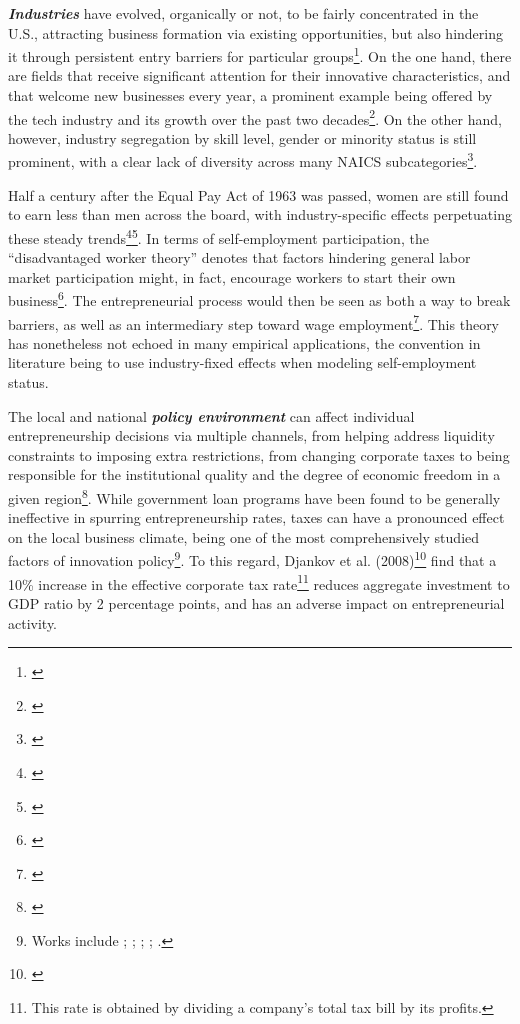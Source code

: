 \textit{\textbf{Industries}} have evolved, organically or not, to be fairly concentrated in the U.S., attracting business formation via existing opportunities, but also hindering it through persistent entry barriers for particular groups\footnote{\cite{ChatterjiGlaeserKerr2014}}. On the one hand, there are fields that receive significant attention for their innovative characteristics, and that welcome new businesses every year, a prominent example being offered by the tech industry and its growth over the past two decades\footnote{\cite{Berman2014}}. On the other hand, however,  industry segregation by skill level, gender or minority status is still prominent, with a clear lack of diversity across many NAICS subcategories\footnote{\cite{cartwright2011job}}. 

Half a century after the Equal Pay Act of 1963 was passed, women are still found to earn less than men across the board, with industry-specific effects perpetuating these steady trends\footnote{\cite{corbett2012graduating}}\hspace{.15em}\footnote{\cite{cartwright2011job}}. In terms of self-employment participation, the ``disadvantaged worker theory'' denotes that factors hindering general labor market participation might, in fact, encourage workers to start their own business\footnote{\cite{PatrickStephensWeinstein2016}}. The entrepreneurial process would then be seen as both a way to break barriers, as well as an intermediary step toward wage employment\footnote{\cite{PatrickStephensWeinstein2016}}. This theory has nonetheless not echoed in many empirical applications, the convention in literature being to use industry-fixed effects when modeling self-employment status.

The local and national \textbf{\textit{policy environment}} can affect individual entrepreneurship decisions via multiple channels, from helping address liquidity constraints to imposing extra restrictions, from changing corporate taxes to being responsible for the institutional quality and the degree of economic freedom in a given region\footnote{\cite{Williams2013}}. While government loan programs have been found to be generally ineffective in spurring entrepreneurship rates, taxes can have a pronounced effect on the local business climate, being one of the most comprehensively studied factors of innovation policy\footnote{Works include \cite{CullenGordon2006}; \cite{DjankovGanserMcLieshRamalhoShleifer2008}; \cite{Goetz2008}; \cite{Lerner2009}; \cite{Williams2013}.}. To this regard, Djankov et al. (2008)\footnote{\cite{DjankovGanserMcLieshRamalhoShleifer2008}} find that a 10\% increase in the effective corporate tax rate\footnote{ This rate is obtained by dividing a company’s total tax bill by its profits.} reduces aggregate investment to GDP ratio by 2 percentage points, and has an adverse impact on entrepreneurial activity. 

